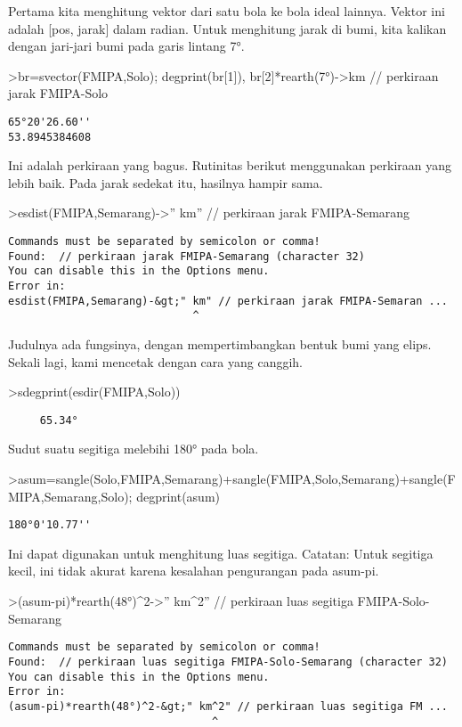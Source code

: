 \documentclass[
]{book}
\begin{document}
Pertama kita menghitung vektor dari satu bola ke bola ideal lainnya. Vektor ini adalah {[}pos, jarak{]} dalam radian. Untuk menghitung jarak di bumi, kita kalikan dengan jari-jari bumi pada garis lintang 7°.

\textgreater br=svector(FMIPA,Solo); degprint(br{[}1{]}), br{[}2{]}*rearth(7°)-\textgreater km // perkiraan jarak FMIPA-Solo

\begin{verbatim}
65°20'26.60''
53.8945384608
\end{verbatim}

Ini adalah perkiraan yang bagus. Rutinitas berikut menggunakan perkiraan yang lebih baik. Pada jarak sedekat itu, hasilnya hampir sama.

\textgreater esdist(FMIPA,Semarang)-\textgreater'' km'' // perkiraan jarak FMIPA-Semarang

\begin{verbatim}
Commands must be separated by semicolon or comma!
Found:  // perkiraan jarak FMIPA-Semarang (character 32)
You can disable this in the Options menu.
Error in:
esdist(FMIPA,Semarang)-&gt;" km" // perkiraan jarak FMIPA-Semaran ...
                             ^
\end{verbatim}

Judulnya ada fungsinya, dengan mempertimbangkan bentuk bumi yang elips. Sekali lagi, kami mencetak dengan cara yang canggih.

\textgreater sdegprint(esdir(FMIPA,Solo))

\begin{verbatim}
     65.34°
\end{verbatim}

Sudut suatu segitiga melebihi 180° pada bola.

\textgreater asum=sangle(Solo,FMIPA,Semarang)+sangle(FMIPA,Solo,Semarang)+sangle(FMIPA,Semarang,Solo); degprint(asum)

\begin{verbatim}
180°0'10.77''
\end{verbatim}

Ini dapat digunakan untuk menghitung luas segitiga. Catatan: Untuk segitiga kecil, ini tidak akurat karena kesalahan pengurangan pada asum-pi.

\textgreater(asum-pi)*rearth(48°)\^{}2-\textgreater'' km\^{}2'' // perkiraan luas segitiga FMIPA-Solo-Semarang

\begin{verbatim}
Commands must be separated by semicolon or comma!
Found:  // perkiraan luas segitiga FMIPA-Solo-Semarang (character 32)
You can disable this in the Options menu.
Error in:
(asum-pi)*rearth(48°)^2-&gt;" km^2" // perkiraan luas segitiga FM ...
                                ^
\end{verbatim}
\end{document}

